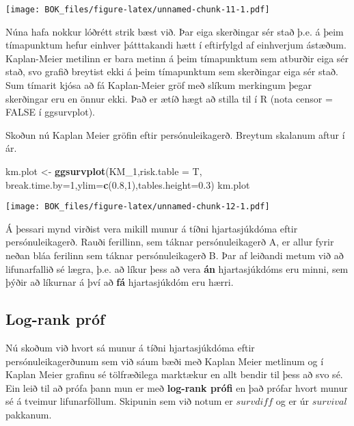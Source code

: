 \documentclass[
]{book}
\newenvironment{Shaded}{\begin{snugshade}}{\end{snugshade}}
\newcommand{\DataTypeTok}[1]{\textcolor[rgb]{0.13,0.29,0.53}{#1}}
\newcommand{\DecValTok}[1]{\textcolor[rgb]{0.00,0.00,0.81}{#1}}
\newcommand{\FloatTok}[1]{\textcolor[rgb]{0.00,0.00,0.81}{#1}}
\newcommand{\KeywordTok}[1]{\textcolor[rgb]{0.13,0.29,0.53}{\textbf{#1}}}
\newcommand{\NormalTok}[1]{#1}
\newcommand{\StringTok}[1]{\textcolor[rgb]{0.31,0.60,0.02}{#1}}
\begin{document}
\texttt{[image: BOK\_files/figure-latex/unnamed-chunk-11-1.pdf]}

Núna hafa nokkur lóðrétt strik bæst við. Þar eiga skerðingar sér stað þ.e. á þeim tímapunktum hefur einhver þátttakandi hætt í eftirfylgd af einhverjum ástæðum. Kaplan-Meier metilinn er bara metinn á þeim tímapunktum sem atburðir eiga sér stað, svo grafið breytist ekki á þeim tímapunktum sem skerðingar eiga sér stað. Sum tímarit kjósa að fá Kaplan-Meier gröf með slíkum merkingum þegar skerðingar eru en önnur ekki. Það er ætíð hægt að stilla til í R (nota censor = FALSE í ggsurvplot).

Skoðun nú Kaplan Meier gröfin eftir persónuleikagerð. Breytum skalanum aftur í ár.

\begin{Shaded}
\begin{Highlighting}[]
\NormalTok{km.plot <{-}}\StringTok{ }\KeywordTok{ggsurvplot}\NormalTok{(KM\_}\DecValTok{1}\NormalTok{,}\DataTypeTok{risk.table =}\NormalTok{ T,}
                        \DataTypeTok{break.time.by=}\DecValTok{1}\NormalTok{,}\DataTypeTok{ylim=}\KeywordTok{c}\NormalTok{(}\FloatTok{0.8}\NormalTok{,}\DecValTok{1}\NormalTok{),}\DataTypeTok{tables.height=}\FloatTok{0.3}\NormalTok{) }
\NormalTok{km.plot}
\end{Highlighting}
\end{Shaded}

\texttt{[image: BOK\_files/figure-latex/unnamed-chunk-12-1.pdf]}

Á þessari mynd virðist vera mikill munur á tíðni hjartasjúkdóma eftir persónuleikagerð. Rauði ferillinn, sem táknar persónuleikagerð A, er allur fyrir neðan bláa ferilinn sem táknar persónuleikagerð B. Þar af leiðandi metum við að lifunarfallið sé lægra, þ.e. að líkur þess að vera \textbf{án} hjartasjúkdóms eru minni, sem þýðir að líkurnar á því að \textbf{fá} hjartasjúkdóm eru hærri.

\hypertarget{log-rank-pruxf3f}{%
\subsection{Log-rank próf}\label{log-rank-pruxf3f}}

Nú skoðum við hvort sá munur á tíðni hjartasjúkdóma eftir persónuleikagerðunum sem við sáum bæði með Kaplan Meier metlinum og í Kaplan Meier grafinu sé tölfræðilega marktækur en allt bendir til þess að svo sé. Ein leið til að prófa þann mun er með \textbf{log-rank prófi} en það prófar hvort munur sé á tveimur lifunarföllum. Skipunin sem við notum er \(survdiff\) og er úr \(survival\) pakkanum.
\end{document}

